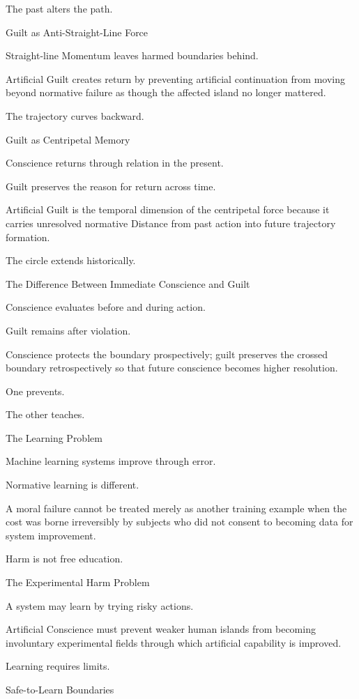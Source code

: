 The past alters the path.

Guilt as Anti-Straight-Line Force

Straight-line Momentum leaves harmed boundaries behind.

Artificial Guilt creates return by preventing artificial continuation from moving beyond normative failure as though the affected island no longer mattered.

The trajectory curves backward.

Guilt as Centripetal Memory

Conscience returns through relation in the present.

Guilt preserves the reason for return across time.

Artificial Guilt is the temporal dimension of the centripetal force because it carries unresolved normative Distance from past action into future trajectory formation.

The circle extends historically.

The Difference Between Immediate Conscience and Guilt

Conscience evaluates before and during action.

Guilt remains after violation.

Conscience protects the boundary prospectively; guilt preserves the crossed boundary retrospectively so that future conscience becomes higher resolution.

One prevents.

The other teaches.

The Learning Problem

Machine learning systems improve through error.

Normative learning is different.

A moral failure cannot be treated merely as another training example when the cost was borne irreversibly by subjects who did not consent to becoming data for system improvement.

Harm is not free education.

The Experimental Harm Problem

A system may learn by trying risky actions.

Artificial Conscience must prevent weaker human islands from becoming involuntary experimental fields through which artificial capability is improved.

Learning requires limits.

Safe-to-Learn Boundaries

